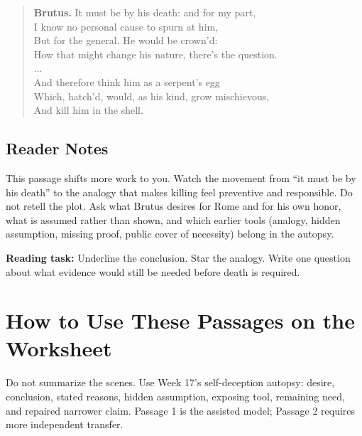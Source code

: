 \documentclass[12pt]{article}
\newenvironment{playpassage}{\begin{quote}\footnotesize\setlength{\parskip}{0.08em}\setlength{\parindent}{0pt}}{\end{quote}}
\newcommand{\speaker}[1]{\textbf{#1.}}
\begin{document}
\begin{playpassage}
\speaker{Brutus} It must be by his death: and for my part,\\
I know no personal cause to spurn at him,\\
But for the general. He would be crown'd:\\
How that might change his nature, there's the question.\\
...\\
And therefore think him as a serpent's egg\\
Which, hatch'd, would, as his kind, grow mischievous,\\
And kill him in the shell.
\end{playpassage}

\subsection*{Reader Notes}

This passage shifts more work to you. Watch the movement from ``it must be by his death'' to the analogy that makes killing feel preventive and responsible. Do not retell the plot. Ask what Brutus desires for Rome and for his own honor, what is assumed rather than shown, and which earlier tools (analogy, hidden assumption, missing proof, public cover of necessity) belong in the autopsy.

\textbf{Reading task:} Underline the conclusion. Star the analogy. Write one question about what evidence would still be needed before death is required.

\section*{How to Use These Passages on the Worksheet}

Do not summarize the scenes. Use Week 17's self-deception autopsy: desire, conclusion, stated reasons, hidden assumption, exposing tool, remaining need, and repaired narrower claim. Passage 1 is the assisted model; Passage 2 requires more independent transfer.
\end{document}
